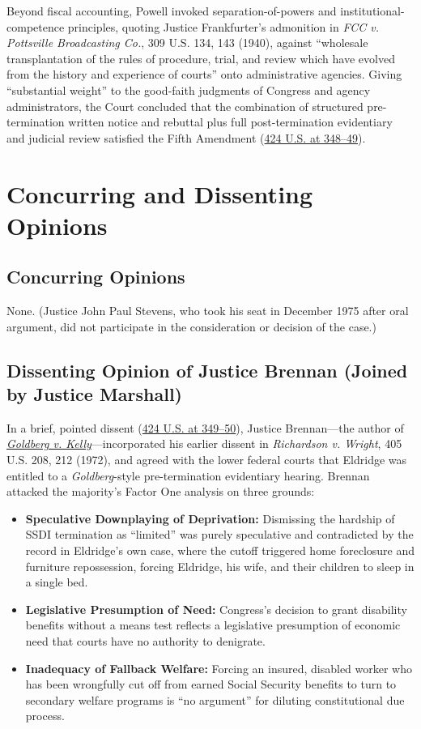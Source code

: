 \documentclass[12pt]{article}
\begin{document}
Beyond fiscal accounting, Powell invoked separation-of-powers and institutional-competence principles, quoting Justice Frankfurter's admonition in \emph{FCC v. Pottsville Broadcasting Co.}, 309 U.S. 134, 143 (1940), against ``wholesale transplantation of the rules of procedure, trial, and review which have evolved from the history and experience of courts'' onto administrative agencies. Giving ``substantial weight'' to the good-faith judgments of Congress and agency administrators, the Court concluded that the combination of structured pre-termination written notice and rebuttal plus full post-termination evidentiary and judicial review satisfied the Fifth Amendment (\href{https://supreme.justia.com/cases/federal/us/424/319/}{424 U.S. at 348--49}).

\section{Concurring and Dissenting Opinions}

\subsection{Concurring Opinions}
None. (Justice John Paul Stevens, who took his seat in December 1975 after oral argument, did not participate in the consideration or decision of the case.)

\subsection{Dissenting Opinion of Justice Brennan (Joined by Justice Marshall)}
In a brief, pointed dissent (\href{https://supreme.justia.com/cases/federal/us/424/319/}{424 U.S. at 349--50}), Justice Brennan---the author of \href{https://supreme.justia.com/cases/federal/us/397/254/}{\emph{Goldberg v. Kelly}}---incorporated his earlier dissent in \emph{Richardson v. Wright}, 405 U.S. 208, 212 (1972), and agreed with the lower federal courts that Eldridge was entitled to a \emph{Goldberg}-style pre-termination evidentiary hearing. Brennan attacked the majority's Factor One analysis on three grounds:
\begin{itemize}
    \item \textbf{Speculative Downplaying of Deprivation:} Dismissing the hardship of SSDI termination as ``limited'' was purely speculative and contradicted by the record in Eldridge's own case, where the cutoff triggered home foreclosure and furniture repossession, forcing Eldridge, his wife, and their children to sleep in a single bed.
    \item \textbf{Legislative Presumption of Need:} Congress's decision to grant disability benefits without a means test reflects a legislative presumption of economic need that courts have no authority to denigrate.
    \item \textbf{Inadequacy of Fallback Welfare:} Forcing an insured, disabled worker who has been wrongfully cut off from earned Social Security benefits to turn to secondary welfare programs is ``no argument'' for diluting constitutional due process.
\end{itemize}
\end{document}
